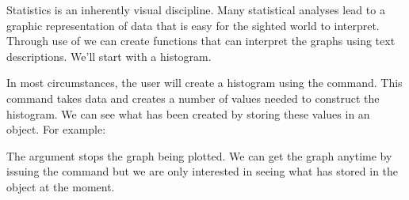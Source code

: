 Statistics is an inherently visual discipline. Many statistical analyses lead to a graphic representation of data that is easy for the sighted world to interpret. Through use of \R{} we can create functions that can interpret the graphs using text descriptions. We'll start with a histogram.  
 
In most circumstances, the user will create a histogram using the  command. This command takes data and creates a number of values needed to construct the histogram. We can see what has been created by storing these values in an object. For example: 
\begin{Schunk}
\end{Schunk}

The  argument stops the graph being plotted. We can get the graph anytime by issuing the  command but we are only interested in seeing what \R{} has stored in the  object at the moment.  

